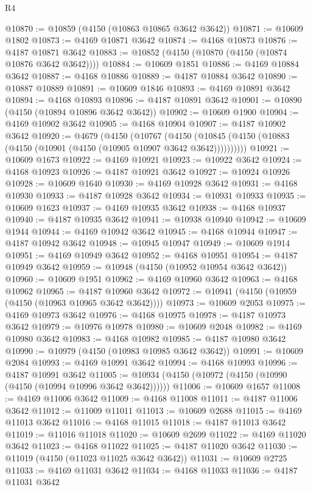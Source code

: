 \begin{lexlean}{R4}
\begin{coremodule}
@10870 := @10859 (@4150 (@10863 @10865 @3642 @3642))
@10871 := @10609 @1802
@10873 := @4169 @10871 @3642
@10874 := @4168 @10873
@10876 := @4187 @10871 @3642
@10883 := @10852 (@4150 (@10870 (@4150 (@10874 @10876 @3642 @3642))))
@10884 := @10609 @1851
@10886 := @4169 @10884 @3642
@10887 := @4168 @10886
@10889 := @4187 @10884 @3642
@10890 := @10887 @10889
@10891 := @10609 @1846
@10893 := @4169 @10891 @3642
@10894 := @4168 @10893
@10896 := @4187 @10891 @3642
@10901 := @10890 (@4150 (@10894 @10896 @3642 @3642))
@10902 := @10609 @1900
@10904 := @4169 @10902 @3642
@10905 := @4168 @10904
@10907 := @4187 @10902 @3642
@10920 := @4679
    (@4150
      (@10767
        (@4150 (@10845 (@4150 (@10883 (@4150 (@10901 (@4150 (@10905 @10907 @3642 @3642))))))))))
@10921 := @10609 @1673
@10922 := @4169 @10921
@10923 := @10922 @3642
@10924 := @4168 @10923
@10926 := @4187 @10921 @3642
@10927 := @10924 @10926
@10928 := @10609 @1640
@10930 := @4169 @10928 @3642
@10931 := @4168 @10930
@10933 := @4187 @10928 @3642
@10934 := @10931 @10933
@10935 := @10609 @1623
@10937 := @4169 @10935 @3642
@10938 := @4168 @10937
@10940 := @4187 @10935 @3642
@10941 := @10938 @10940
@10942 := @10609 @1944
@10944 := @4169 @10942 @3642
@10945 := @4168 @10944
@10947 := @4187 @10942 @3642
@10948 := @10945 @10947
@10949 := @10609 @1914
@10951 := @4169 @10949 @3642
@10952 := @4168 @10951
@10954 := @4187 @10949 @3642
@10959 := @10948 (@4150 (@10952 @10954 @3642 @3642))
@10960 := @10609 @1951
@10962 := @4169 @10960 @3642
@10963 := @4168 @10962
@10965 := @4187 @10960 @3642
@10972 := @10941 (@4150 (@10959 (@4150 (@10963 @10965 @3642 @3642))))
@10973 := @10609 @2053
@10975 := @4169 @10973 @3642
@10976 := @4168 @10975
@10978 := @4187 @10973 @3642
@10979 := @10976 @10978
@10980 := @10609 @2048
@10982 := @4169 @10980 @3642
@10983 := @4168 @10982
@10985 := @4187 @10980 @3642
@10990 := @10979 (@4150 (@10983 @10985 @3642 @3642))
@10991 := @10609 @2084
@10993 := @4169 @10991 @3642
@10994 := @4168 @10993
@10996 := @4187 @10991 @3642
@11005 := @10934 (@4150 (@10972 (@4150 (@10990 (@4150 (@10994 @10996 @3642 @3642))))))
@11006 := @10609 @1657
@11008 := @4169 @11006 @3642
@11009 := @4168 @11008
@11011 := @4187 @11006 @3642
@11012 := @11009 @11011
@11013 := @10609 @2688
@11015 := @4169 @11013 @3642
@11016 := @4168 @11015
@11018 := @4187 @11013 @3642
@11019 := @11016 @11018
@11020 := @10609 @2699
@11022 := @4169 @11020 @3642
@11023 := @4168 @11022
@11025 := @4187 @11020 @3642
@11030 := @11019 (@4150 (@11023 @11025 @3642 @3642))
@11031 := @10609 @2725
@11033 := @4169 @11031 @3642
@11034 := @4168 @11033
@11036 := @4187 @11031 @3642

\end{coremodule}
\end{lexlean}
